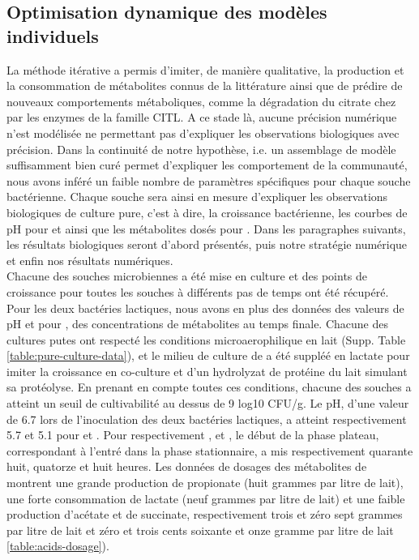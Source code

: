 \documentclass[../main.tex]{subfiles}
\begin{document}
\subsection{Optimisation dynamique des modèles individuels}
La méthode itérative a permis d'imiter, de manière qualitative, la production et la consommation de métabolites connus de la littérature ainsi que de prédire de nouveaux comportements métaboliques, comme la dégradation du citrate chez \plantarum par les enzymes de la famille CITL. A ce stade là, aucune précision numérique n'est modélisée ne permettant pas d'expliquer les observations biologiques avec précision. Dans la continuité de notre hypothèse, i.e. un assemblage de modèle suffisamment bien curé permet d'expliquer les comportement de la communauté, nous avons inféré un faible nombre de paramètres spécifiques pour chaque souche bactérienne. Chaque souche sera ainsi en mesure d'expliquer les observations biologiques de culture pure, c'est à dire, la croissance bactérienne, les courbes de pH pour \lactis et \plantarum ainsi que les métabolites dosés pour \freud. Dans les paragraphes suivants, les résultats biologiques seront d'abord présentés, puis notre stratégie numérique et enfin nos résultats numériques.\\

Chacune des souches microbiennes a été mise en culture et des points de croissance pour toutes les souches à différents pas de temps ont été récupéré. Pour les deux bactéries lactiques, nous avons en plus des données des valeurs de pH et pour \freud, des concentrations de métabolites au temps finale. Chacune des cultures putes ont respecté les conditions microaerophilique en lait (Supp. Table \ref{table:pure-culture-data}), et le milieu de culture de \freud a été suppléé en lactate pour imiter la croissance en co-culture et d'un hydrolyzat de protéine du lait simulant sa protéolyse. En prenant en compte toutes ces conditions, chacune des souches a atteint un seuil de cultivabilité au dessus de 9 log10 CFU/g. Le pH, d'une valeur de 6.7 lors de l'inoculation des deux bactéries lactiques, a atteint respectivement 5.7 et 5.1 pour \plantarum et \lactis. Pour respectivement \freud, \plantarum et \lactis, le début de la phase plateau, correspondant à l'entré dans la phase stationnaire, a mis respectivement quarante huit, quatorze et huit heures. Les données de dosages des métabolites de \freud montrent une grande production de propionate (huit grammes par litre de lait), une forte consommation de lactate (neuf grammes par litre de lait) et une faible production d'acétate et de succinate, respectivement trois et zéro sept grammes par litre de lait et zéro et trois cents soixante et onze gramme par litre de lait \ref{table:acids-dosage}). \\
\end{document}

